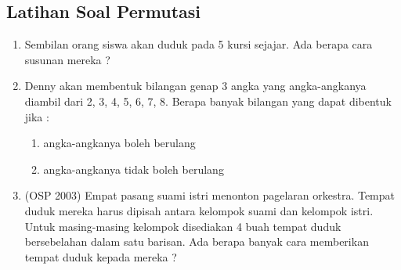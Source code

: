 \subsection{Latihan Soal Permutasi}
\begin{enumerate} 
    \item Sembilan orang siswa akan duduk pada 5 kursi sejajar. Ada berapa cara susunan mereka ? 
    
    \item Denny akan membentuk bilangan genap 3 angka yang angka-angkanya diambil dari 2, 3, 4, 5, 6, 7, 8. Berapa banyak bilangan yang dapat dibentuk jika : 
    \begin{enumerate}
        \item angka-angkanya boleh berulang 
        \item angka-angkanya tidak boleh berulang
    \end{enumerate}
    
    \item (OSP 2003) Empat pasang suami istri menonton pagelaran orkestra. Tempat duduk mereka harus dipisah antara kelompok suami dan kelompok istri. Untuk masing-masing kelompok disediakan 4 buah tempat duduk bersebelahan dalam satu barisan. Ada berapa banyak cara memberikan tempat duduk kepada mereka ?
\end{enumerate}